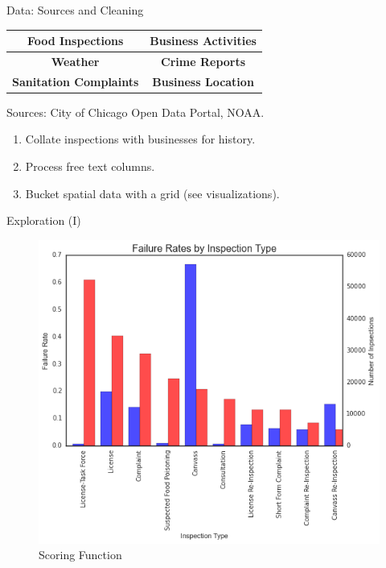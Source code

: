 \documentclass[final]{beamer}
\newlength{\onecolwid}
\begin{document}
\begin{frame}[t]
\begin{columns}[t]
\begin{column}{\onecolwid}
\begin{block}{Data: Sources and Cleaning}
\def\arraystretch{1.5}
\begin{tabular}{|c| c|}
\hline
\textbf{Food Inspections} & \textbf{Business Activities} \\ \hline
\textbf{Weather} & \textbf{Crime Reports} \\ \hline
\textbf{Sanitation Complaints} & \textbf{Business Location}\\ \hline
\end{tabular}\vspace{0.2in.}
Sources: City of Chicago Open Data Portal, NOAA. 

\begin{enumerate}
    \item Collate inspections with businesses for history.
    \item Process free text columns.
    \item Bucket spatial data with a grid (see visualizations).
\end{enumerate}

\end{block}

\vspace{-1in.}
\begin{block}{Exploration (I)}
\begin{figure}
\includegraphics[width=\linewidth]{figures/luke_placeholder.png}
\caption{Scoring Function}
\end{figure}
\end{block}



\end{column}
\end{columns}
\end{frame}
\end{document}
